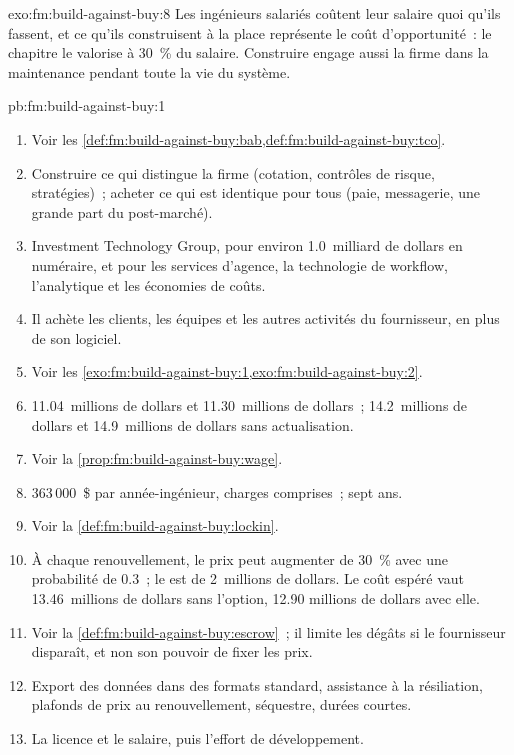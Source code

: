 \begin{solution}{exo:fm:build-against-buy:8}
Les ingénieurs salariés coûtent leur salaire quoi qu'ils fassent, et ce qu'ils construisent à la place représente le coût d'opportunité~: le chapitre le valorise à 30~\% du
salaire. Construire engage aussi la firme dans la maintenance pendant toute la vie du système.
\end{solution}

\begin{solution}{pb:fm:build-against-buy:1}
\begin{enumerate}
\item Voir les \cref{def:fm:build-against-buy:bab,def:fm:build-against-buy:tco}.
\item Construire ce qui distingue la firme (cotation, contrôles de risque, stratégies)~; acheter ce qui est identique pour tous (paie, messagerie, une grande part du post-marché).
\item Investment Technology Group, pour environ 1.0~milliard de dollars en numéraire, et pour les services d'agence, la technologie de workflow, l'analytique et les économies de coûts.
\item Il achète les clients, les équipes et les autres activités du fournisseur, en plus de son logiciel.
\item Voir les \cref{exo:fm:build-against-buy:1,exo:fm:build-against-buy:2}.
\item 11.04~millions de dollars et 11.30~millions de dollars~; 14.2~millions de dollars et 14.9~millions de dollars sans actualisation.
\item Voir la \cref{prop:fm:build-against-buy:wage}.
\item 363\,000~\$ par année-ingénieur, charges comprises~; sept ans.
\item Voir la \cref{def:fm:build-against-buy:lockin}.
\item À chaque renouvellement, le prix peut augmenter de 30~\% avec une probabilité de 0.3~; le  est de 2~millions de dollars. Le coût espéré vaut 13.46~millions de dollars sans l'option, 12.90
millions de dollars avec elle.
\item Voir la \cref{def:fm:build-against-buy:escrow}~; il limite les dégâts si le fournisseur disparaît, et non son pouvoir de fixer les prix.
\item Export des données dans des formats standard, assistance à la résiliation, plafonds de prix au renouvellement, séquestre, durées courtes.
\item La licence et le salaire, puis l'effort de développement.

\end{enumerate}
\end{solution}
